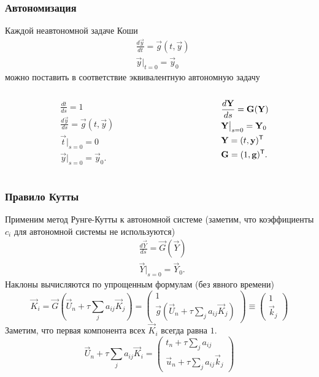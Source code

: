 \documentclass[professionalfonts,compress,unicode,aspectratio=169]{beamer}
\begin{document}
\begin{frame}\frametitle{Автономизация}
	Каждой неавтономной задаче Коши
	\begin{align*}
		&\frac{d\vec y}{dt} = \vec g(t, \vec y)\\
		&\vec y\big|_{t=0} = \vec y_0
	\end{align*}
	можно поставить в соответствие эквивалентную автономную задачу
	\begin{columns}
	\begin{column}{.5\textwidth}
	\begin{align*}
		&\frac{dt}{ds} = 1\\
		&\frac{d\vec y}{ds} = \vec g(t, \vec y)\\
		&\vec t\big|_{s=0} = 0\\
		&\vec y\big|_{s=0} = \vec y_0.
	\end{align*}
	\end{column}
	\begin{column}{.5\textwidth}
	\begin{align*}
		&\frac{d\boldsymbol{\mathbf{Y}}}{ds} = \boldsymbol{\mathbf{G}}(\boldsymbol{\mathbf{Y}})\\
		&\boldsymbol{\mathbf{Y}}\big|_{s=0} = \boldsymbol{\mathbf{Y}}_0\\
		&\boldsymbol{\mathbf{Y}} = (t, \boldsymbol{\mathbf{y}})^{\mathsf{T}}\\
		&\boldsymbol{\mathbf{G}} = (1, \boldsymbol{\mathbf{g}})^{\mathsf{T}}.
	\end{align*}
	\end{column}
	\end{columns}
\end{frame}

\begin{frame}\frametitle{Правило Кутты}
	Применим метод Рунге-Кутты к автономной системе (заметим, что коэффициенты
$c_i$ для автономной системы не используются)
	\begin{align*}
		&\frac{d\vec Y}{ds} = \vec G(\vec Y)\\
		&\vec Y\big|_{s=0} = \vec Y_0.
	\end{align*}
	Наклоны вычисляются по упрощенным формулам (без явного времени)
	\[
		\vec K_i = \vec G(\vec U_{n} + \tau \sum_{j} a_{ij} \vec K_j) =
\begin{pmatrix}
1\\
\vec g(\vec U_n + \tau \sum_j a_{ij} \vec K_j)
\end{pmatrix}
\equiv
\begin{pmatrix}
1\\
\vec k_j
\end{pmatrix}
	\]
	Заметим, что первая компонента всех $\vec K_i$ всегда равна $1$.
	\[
	\vec U_n + \tau \sum_j a_{ij} \vec K_i = \begin{pmatrix}
t_n + \tau \sum_j a_{ij}\\
\vec u_n + \tau \sum_j a_{ij} \vec k_j
\end{pmatrix}
	\]
\end{frame}
\end{document}
